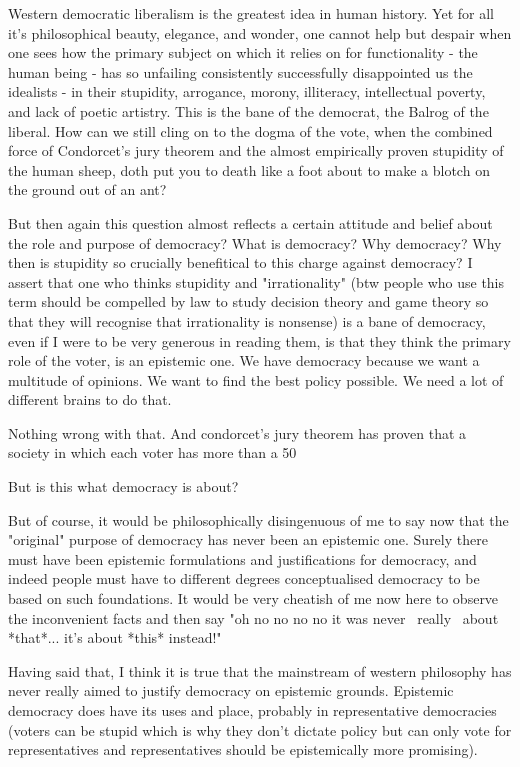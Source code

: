 Western democratic liberalism is the greatest idea in human history. Yet for all it's philosophical beauty, elegance, and wonder, one cannot help but despair when one sees how the primary subject on which it relies on for functionality - the human being - has so unfailing consistently successfully disappointed us the idealists - in their stupidity, arrogance, morony, illiteracy, intellectual poverty, and lack of poetic artistry. This is the bane of the democrat, the Balrog of the liberal. How can we still cling on to the dogma of the vote, when the combined force of Condorcet's jury theorem and the almost empirically proven stupidity of the human sheep, doth put you to death like a foot about to make a blotch on the ground out of an ant? 

But then again this question almost reflects a certain attitude and belief about the role and purpose of democracy? What is democracy? Why democracy? Why then is stupidity so crucially benefitical to this charge against democracy? I assert that one who thinks stupidity and "irrationality" (btw people who use this term should be compelled by law to study decision theory and game theory so that they will recognise that irrationality is nonsense) is a bane of democracy, even if I were to be very generous in reading them, is that they think the primary role of the voter, is an epistemic one. We have democracy because we want a multitude of opinions. We want to find the best policy possible. We need a lot of different brains to do that. 

Nothing wrong with that. And condorcet's jury theorem has proven that a society in which each voter has more than a 50%

But is this what democracy is about? 

But of course, it would be philosophically disingenuous of me to say now that the "original" purpose of democracy has never been an epistemic one. Surely there must have been epistemic formulations and justifications for democracy, and indeed people must have to different degrees conceptualised democracy to be based on such foundations. It would be very cheatish of me now here to observe the inconvenient facts and then say "oh no no no no it was never ~really~ about *that*... it's about *this* instead!"

Having said that, I think it is true that the mainstream of western philosophy has never really aimed to justify democracy on epistemic grounds. Epistemic democracy does have its uses and place, probably in representative democracies (voters can be stupid which is why they don't dictate policy but can only vote for representatives and representatives should be epistemically more promising).

